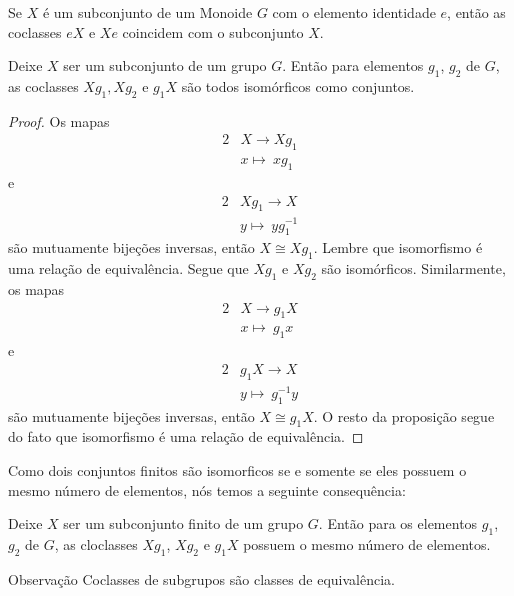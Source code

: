 Se $X$ é um subconjunto de um Monoide $G$ com o elemento identidade $e$, então as coclasses $eX$ e $Xe$ coincidem com o subconjunto $X$. 
\begin{stat}
  Deixe $X$ ser um subconjunto de um grupo $G$. Então para elementos $g_{1}$, $g_{2}$ de $G$, as coclasses $Xg_{1},Xg_{2}$ e $g_{1}X$ são todos isomórficos como conjuntos.
  \begin{proof}
    Os mapas
    \begin{alignat}{2}
      &X \to Xg_{1} \nonumber\\
      &x \mapsto\ xg_{1}
      \nonumber
    \end{alignat}
    e
    \begin{alignat}{2}
      &Xg_{1} \to X \nonumber\\
      &y \mapsto\ yg_{1}^{-1}
      \nonumber
    \end{alignat}
    são mutuamente bijeções inversas, então $X\cong Xg_{1}$. Lembre que isomorfismo é uma relação de equivalência. Segue que $Xg_{1}$ e $Xg_{2}$ são isomórficos. Similarmente, os mapas
    \begin{alignat}{2}
      &X \to g_{1}X \nonumber\\
      &x \mapsto\ g_{1}x
      \nonumber
    \end{alignat}
    e
    \begin{alignat}{2}
      &g_{1}X \to X \nonumber\\
      &y \mapsto\ g_{1}^{-1}y
      \nonumber
    \end{alignat}
    são mutuamente bijeções inversas, então $X\cong g_{1}X$. O resto da proposição segue do fato que isomorfismo é uma relação de equivalência.
  \end{proof}
\end{stat}

Como dois conjuntos finitos são isomorficos se e somente se eles possuem o mesmo número de elementos, nós temos a seguinte consequência:
\begin{corollary}
  Deixe $X$ ser um subconjunto finito de um grupo $G$. Então para os elementos $g_{1}$, $g_{2}$ de $G$, as cloclasses $Xg_{1}$, $Xg_{2}$ e $g_{1}X$ possuem o mesmo número de elementos.
\end{corollary}

\begin{mymdframed}{Observação}
  Coclasses de subgrupos são classes de equivalência.
\end{mymdframed}

